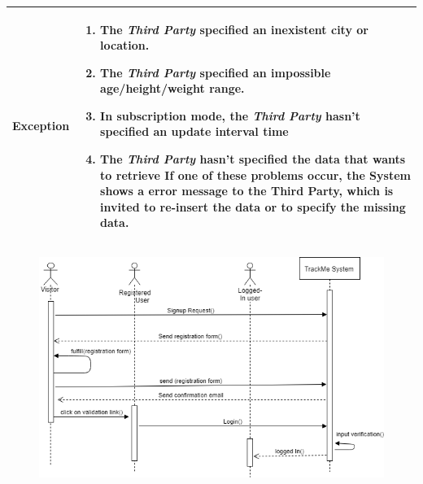 \begin{table}[H]
\begin{tabular}{|p{3.5cm}|p{10.3cm}|}
    \hline
    \textbf{\large{Exception}} 			& \begin{enumerate}[leftmargin=0.5cm] \item The \emph{Third                         Party} specified an inexistent                            city or location.
                                 \item The \emph{Third Party} specified an impossible age/height/weight range.          \item In subscription mode, the \emph{Third Party} hasn't specified an update interval time
                                 \item The \emph{Third Party} hasn't specified the data that wants to retrieve
    										If one of these problems occur, the System shows a error message to the Third Party, which is invited to re-insert the data or to specify the missing data.
    							\end{enumerate}
    							\\
    
    \hline
    
    
    \end{tabular}
	
\end{table}
\begin{figure}[H]
    \centering
    \includegraphics[scale=0.4]{rasdL/Pictures/login1.png}
    
\end{figure}
